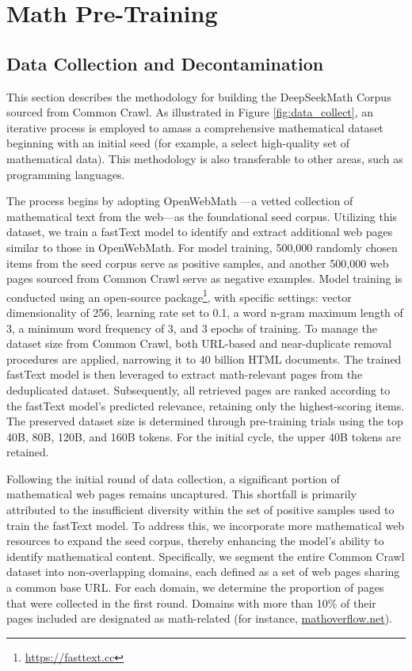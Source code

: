 \section{Math Pre-Training}

\subsection{Data Collection and Decontamination} This section describes the methodology for building the DeepSeekMath Corpus sourced from Common Crawl. As illustrated in Figure \ref{fig:data_collect}, an iterative process is employed to amass a comprehensive mathematical dataset beginning with an initial seed (for example, a select high-quality set of mathematical data). This methodology is also transferable to other areas, such as programming languages.

The process begins by adopting OpenWebMath \citep{openwebmath}—a vetted collection of mathematical text from the web—as the foundational seed corpus. Utilizing this dataset, we train a fastText model \citep{joulin2016fasttext} to identify and extract additional web pages similar to those in OpenWebMath. For model training, 500,000 randomly chosen items from the seed corpus serve as positive samples, and another 500,000 web pages sourced from Common Crawl serve as negative examples. Model training is conducted using an open-source package\footnote{\url{https://fasttext.cc}}, with specific settings: vector dimensionality of 256, learning rate set to 0.1, a word n-gram maximum length of 3, a minimum word frequency of 3, and 3 epochs of training. To manage the dataset size from Common Crawl, both URL-based and near-duplicate removal procedures are applied, narrowing it to 40 billion HTML documents. The trained fastText model is then leveraged to extract math-relevant pages from the deduplicated dataset. Subsequently, all retrieved pages are ranked according to the fastText model's predicted relevance, retaining only the highest-scoring items. The preserved dataset size is determined through pre-training trials using the top 40B, 80B, 120B, and 160B tokens. For the initial cycle, the upper 40B tokens are retained.

Following the initial round of data collection, a significant portion of mathematical web pages remains uncaptured. This shortfall is primarily attributed to the insufficient diversity within the set of positive samples used to train the fastText model. To address this, we incorporate more mathematical web resources to expand the seed corpus, thereby enhancing the model’s ability to identify mathematical content. Specifically, we segment the entire Common Crawl dataset into non-overlapping domains, each defined as a set of web pages sharing a common base URL. For each domain, we determine the proportion of pages that were collected in the first round. Domains with more than 10\% of their pages included are designated as math-related (for instance, \url{mathoverflow.net}).

